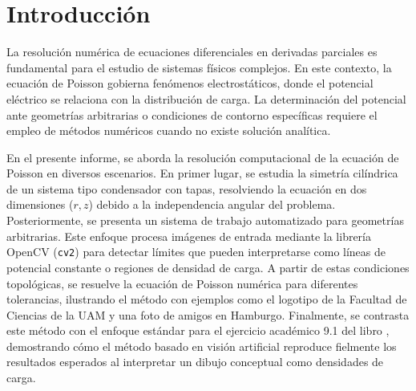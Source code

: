 \section{Introducción}

La resolución numérica de ecuaciones diferenciales en derivadas parciales es fundamental para el estudio de sistemas físicos complejos. En este contexto, la ecuación de Poisson gobierna fenómenos electrostáticos, donde el potencial eléctrico se relaciona con la distribución de carga. La determinación del potencial ante geometrías arbitrarias o condiciones de contorno específicas requiere el empleo de métodos numéricos cuando no existe solución analítica.

En el presente informe, se aborda la resolución computacional de la ecuación de Poisson en diversos escenarios. En primer lugar, se estudia la simetría cilíndrica de un sistema tipo condensador con tapas, resolviendo la ecuación en dos dimensiones ($r, z$) debido a la independencia angular del problema. Posteriormente, se presenta un sistema de trabajo automatizado para geometrías arbitrarias. Este enfoque procesa imágenes de entrada mediante la librería OpenCV (\texttt{cv2}) para detectar límites que pueden interpretarse como líneas de potencial constante o regiones de densidad de carga. A partir de estas condiciones topológicas, se resuelve la ecuación de Poisson numérica para diferentes tolerancias, ilustrando el método con ejemplos como el logotipo de la Facultad de Ciencias de la UAM y una foto de amigos en Hamburgo. Finalmente, se contrasta este método con el enfoque estándar para el ejercicio académico 9.1 del libro \citet{newman2012computational}, demostrando cómo el método basado en visión artificial reproduce fielmente los resultados esperados al interpretar un dibujo conceptual como densidades de carga.
